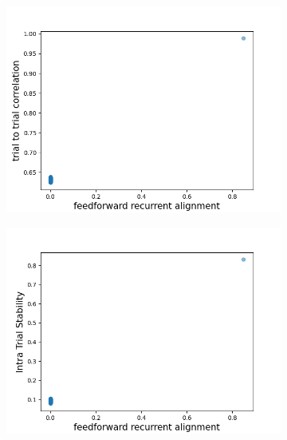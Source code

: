 \documentclass[11pt]{article}
\begin{document}
%	
		\begin{figure}[H]
			\centering
			\begin{subfigure}[b]{0.45\textwidth}
				\includegraphics[width=\textwidth]{../figures/low_rank_sym_ttc.png}
				\caption{}
			\end{subfigure}
			\begin{subfigure}[b]{0.45\textwidth}
				\includegraphics[width=\textwidth]{../figures/its_low_rank_sym_without_noise.png}
				\caption{}
			\end{subfigure}

\end{figure}
\end{document}
